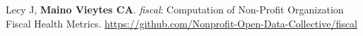 




\begin{cvskills}

  \cvskill
    {} %
    {Lecy J, \textbf{Maino Vieytes CA}. \textit{fiscal}: Computation of Non-Profit Organization Fiscal Health Metrics. \textcolor{navyblue}{\underline{\href{https://github.com/Nonprofit-Open-Data-Collective/fiscal }{https://github.com/Nonprofit-Open-Data-Collective/fiscal}}}}


  \end{cvskills}